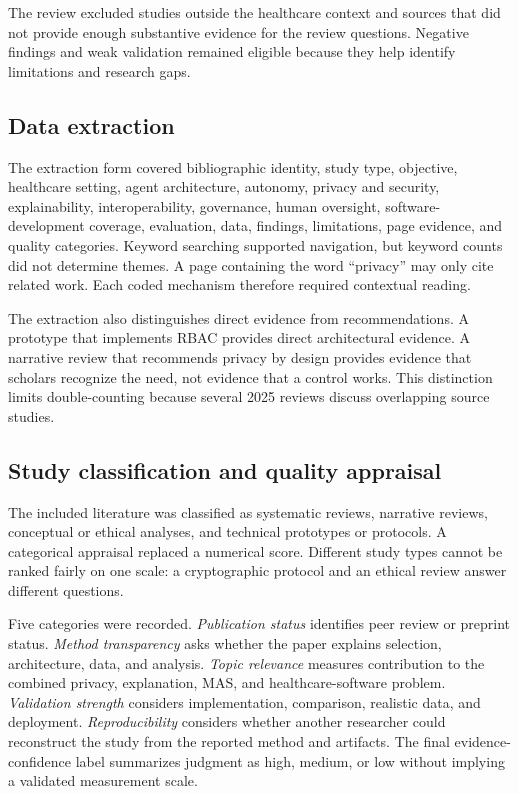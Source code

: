 \documentclass[11pt,a4paper]{article}
\begin{document}
The review excluded studies outside the healthcare context and sources that did not provide enough substantive evidence for the review questions. Negative findings and weak validation remained eligible because they help identify limitations and research gaps.

\subsection{Data extraction}

The extraction form covered bibliographic identity, study type, objective, healthcare setting, agent architecture, autonomy, privacy and security, explainability, interoperability, governance, human oversight, software-development coverage, evaluation, data, findings, limitations, page evidence, and quality categories. Keyword searching supported navigation, but keyword counts did not determine themes. A page containing the word ``privacy'' may only cite related work. Each coded mechanism therefore required contextual reading.

The extraction also distinguishes direct evidence from recommendations. A prototype that implements RBAC provides direct architectural evidence. A narrative review that recommends privacy by design provides evidence that scholars recognize the need, not evidence that a control works. This distinction limits double-counting because several 2025 reviews discuss overlapping source studies.

\subsection{Study classification and quality appraisal}

The included literature was classified as systematic reviews, narrative reviews, conceptual or ethical analyses, and technical prototypes or protocols. A categorical appraisal replaced a numerical score. Different study types cannot be ranked fairly on one scale: a cryptographic protocol and an ethical review answer different questions.

Five categories were recorded. \emph{Publication status} identifies peer review or preprint status. \emph{Method transparency} asks whether the paper explains selection, architecture, data, and analysis. \emph{Topic relevance} measures contribution to the combined privacy, explanation, MAS, and healthcare-software problem. \emph{Validation strength} considers implementation, comparison, realistic data, and deployment. \emph{Reproducibility} considers whether another researcher could reconstruct the study from the reported method and artifacts. The final evidence-confidence label summarizes judgment as high, medium, or low without implying a validated measurement scale.
\end{document}
